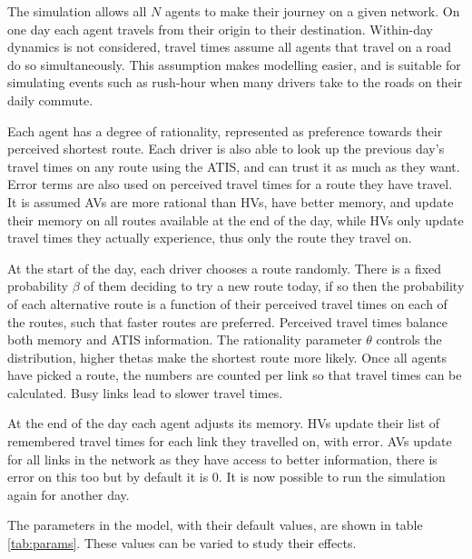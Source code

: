\documentclass[12pt, a4paper, onecolumn]{article}
\begin{document}
The simulation allows all $N$ agents to make their journey on a given network. On one day each agent travels from their origin to their destination. Within-day dynamics is not considered, travel times assume all agents that travel on a road do so simultaneously. This assumption makes modelling easier, and is suitable for simulating events such as rush-hour when many drivers take to the roads on their daily commute.

Each agent has a degree of rationality, represented as preference towards their perceived shortest route. Each driver is also able to look up the previous day's travel times on any route using the ATIS, and can trust it as much as they want. Error terms are also used on perceived travel times for a route they have travel. It is assumed AVs are more rational than HVs, have better memory, and update their memory on all routes available at the end of the day, while HVs only update travel times they actually experience, thus only the route they travel on.

At the start of the day, each driver chooses a route randomly. There is a fixed probability $\beta$ of them deciding to try a new route today, if so then the probability of each alternative route is a function of their perceived travel times on each of the routes, such that faster routes are preferred. Perceived travel times balance both memory and ATIS information. The rationality parameter $\theta$ controls the distribution, higher thetas make the shortest route more likely. Once all agents have picked a route, the numbers are counted per link so that travel times can be calculated. Busy links lead to slower travel times.

At the end of the day each agent adjusts its memory. HVs update their list of remembered travel times for each link they travelled on, with error. AVs update for all links in the network as they have access to better information, there is error on this too but by default it is 0. It is now possible to run the simulation again for another day.

The parameters in the model, with their default values, are shown in table \ref{tab:params}. These values can be varied to study their effects.
\end{document}

